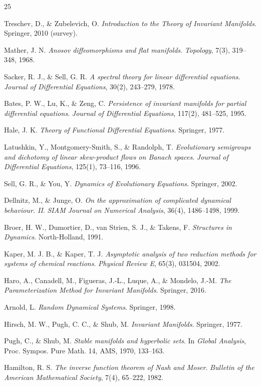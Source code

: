 \documentclass[11pt,a4paper]{article}
\theoremstyle{plain}
\theoremstyle{definition}
\theoremstyle{remark}
\numberwithin{equation}{section}
\numberwithin{figure}{section}
\begin{document}
\begin{thebibliography}{25}

 Treschev, D., \& Zubelevich, O. \textit{Introduction to the Theory of Invariant Manifolds}. Springer, 2010 (survey).

 Mather, J. N. \textit{Anosov diffeomorphisms and flat manifolds}. \textit{Topology}, 7(3), 319–348, 1968.

 Sacker, R. J., \& Sell, G. R. \textit{A spectral theory for linear differential equations}. \textit{Journal of Differential Equations}, 30(2), 243–279, 1978.

 Bates, P. W., Lu, K., \& Zeng, C. \textit{Persistence of invariant manifolds for partial differential equations}. \textit{Journal of Differential Equations}, 117(2), 481–525, 1995.

 Hale, J. K. \textit{Theory of Functional Differential Equations}. Springer, 1977.

 Latushkin, Y., Montgomery-Smith, S., \& Randolph, T. \textit{Evolutionary semigroups and dichotomy of linear skew-product flows on Banach spaces}. \textit{Journal of Differential Equations}, 125(1), 73–116, 1996.

 Sell, G. R., \& You, Y. \textit{Dynamics of Evolutionary Equations}. Springer, 2002.

 Dellnitz, M., \& Junge, O. \textit{On the approximation of complicated dynamical behaviour. II}. \textit{SIAM Journal on Numerical Analysis}, 36(4), 1486–1498, 1999.

 Broer, H. W., Dumortier, D., van Strien, S. J., \& Takens, F. \textit{Structures in Dynamics}. North-Holland, 1991.

 Kaper, M. J. B., \& Kaper, T. J. \textit{Asymptotic analysis of two reduction methods for systems of chemical reactions}. \textit{Physical Review E}, 65(3), 031504, 2002.

 Haro, A., Canadell, M., Figueras, J.-L., Luque, A., \& Mondelo, J.-M. \textit{The Parameterization Method for Invariant Manifolds}. Springer, 2016.

 Arnold, L. \textit{Random Dynamical Systems}. Springer, 1998.

 Hirsch, M. W., Pugh, C. C., \& Shub, M. \textit{Invariant Manifolds}. Springer, 1977.

 Pugh, C., \& Shub, M. \textit{Stable manifolds and hyperbolic sets}. In \textit{Global Analysis}, Proc. Sympos. Pure Math. 14, AMS, 1970, 133–163.

 Hamilton, R. S. \textit{The inverse function theorem of Nash and Moser}. \textit{Bulletin of the American Mathematical Society}, 7(4), 65–222, 1982.

\end{thebibliography}

\end{document}
